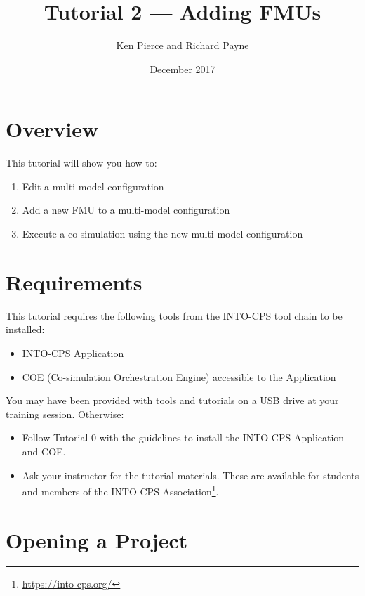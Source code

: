 \documentclass[11pt,a4paper]{../tutorial}
\title{Tutorial 2 --- Adding FMUs}
\date{December 2017}
\author{Ken Pierce and Richard Payne}
\begin{document}
\section*{Overview}

This tutorial will show you how to:

\begin{enumerate}[noitemsep]
\item Edit a multi-model configuration
\item Add a new FMU to a multi-model configuration
\item Execute a co-simulation using the new multi-model configuration
\end{enumerate}

\section*{Requirements}

This tutorial requires the following tools from the INTO-CPS tool chain to be installed:

\begin{itemize}[noitemsep]
\item INTO-CPS Application
\item COE (Co-simulation Orchestration Engine) accessible to the Application
\end{itemize}

You may have been provided with tools and tutorials on a USB drive at your training session. Otherwise: 
\begin{itemize}[noitemsep]
\item Follow Tutorial 0 with the guidelines to install the INTO-CPS Application and COE.
\item Ask your instructor for the tutorial materials. These are available for students and members of the INTO-CPS Association\footnote{\url{https://into-cps.org/}}.
\end{itemize}



\section{Opening a Project}
\end{document}
